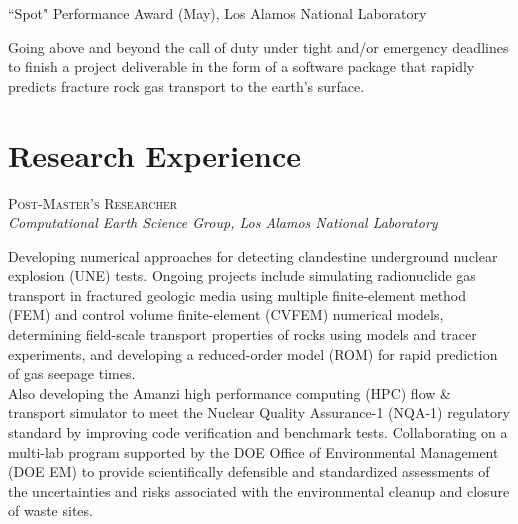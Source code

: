 \documentclass[11pt, letterpaper]{article}
\newcommand{\years}[1]{\marginnote{\scriptsize #1}}
\begin{document}
\years{2018}“Spot" Performance Award (May), Los Alamos National Laboratory
\begin{adjustwidth}{5pt}{0pt}
	Going above and beyond the call of duty under tight and/or emergency deadlines to finish a project deliverable in the form of a software package that rapidly predicts fracture rock gas transport to the earth’s surface.
\end{adjustwidth}
\section*{Research Experience}
\noindent
\years{2017 - present}\textsc{Post-Master's Researcher}\\
\textit{Computational Earth Science Group, Los Alamos National Laboratory}
\begin{adjustwidth}{5pt}{0pt}
	Developing numerical approaches for detecting clandestine underground nuclear explosion (UNE) tests. Ongoing projects include simulating radionuclide gas transport in fractured geologic media using multiple finite-element method (FEM) and control volume finite-element (CVFEM) numerical models, determining field-scale transport properties of rocks using models and tracer experiments, and developing a reduced-order model (ROM) for rapid prediction of gas seepage times.\\
	Also developing the Amanzi high performance computing (HPC) flow \& transport simulator to meet the Nuclear Quality Assurance-1 (NQA-1) regulatory standard by improving code verification and benchmark tests. Collaborating on a multi-lab program supported by the DOE Office of Environmental Management (DOE EM) to provide scientifically defensible and standardized assessments of the uncertainties and risks associated with the environmental cleanup and closure of waste sites.
\end{adjustwidth}
\end{document}
